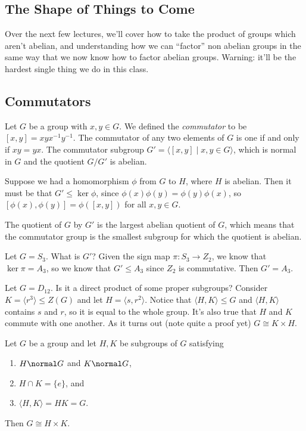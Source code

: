 \subsection{The Shape of Things to Come}

Over the next few lectures, we'll cover how to take the product of groups which aren't abelian, and understanding how we can ``factor'' non abelian groups in the same way that we now know how to factor abelian groups.
Warning: it'll be the hardest single thing we do in this class.

\subsection{Commutators}

Let $G$ be a group with $x,y \in G$. We defined the \emph{commutator} to be $[x,y] = xyx^{-1}y^{-1}$. The commutator of any two elements of $G$ is one if and only if $xy = yx$. The commutator subgroup $G' = \langle [x,y] \mid x,y \in G \rangle$, which is normal in $G$ and the quotient $G/G'$ is abelian.

Suppose we had a homomorphism $\phi$ from $G$ to $H$, where $H$ is abelian. Then it must be that $G' \leq \ker \phi$, since $\phi(x)\phi(y) = \phi(y)\phi(x)$, so $[\phi(x),\phi(y)] = \phi([x,y])$ for all $x,y \in G$.

The quotient of $G$ by $G'$ is the largest abelian quotient of $G$, which means that the commutator group is the smallest subgroup for which the quotient is abelian.

\begin{example}
Let $G = S_3$. What is $G'$? Given the sign map $\pi : S_3 \to Z_2$, we know that $\ker \pi = A_3$, so we know that $G' \leq A_3$ since $Z_2$ is commutative. Then $G' = A_3$.
\end{example}

\begin{example}
Let $G = D_{12}$. Is it a direct product of some proper subgroups? Consider $K = \langle r^3 \rangle \leq Z(G)$ and let $H = \langle s, r^2 \rangle$. Notice that $\langle H,K \rangle \leq G$ and $\langle H,K \rangle$ contains $s$ and $r$, so it is equal to the whole group. It's also true that $H$ and $K$ commute with one another. As it turns out (note quite a proof yet) $G \cong K \times H$. 
\end{example}

\begin{theorem}
Let $G$ be a group and let $H,K$ be subgroups of $G$ satisfying
\begin{enumerate}
\item $H \normal G$ and $K \normal G$, 
\item $H \cap K = \{e\}$, and 
\item $\langle H,K \rangle = HK = G$.
\end{enumerate}
Then $G \cong H \times K$.
\end{theorem}

